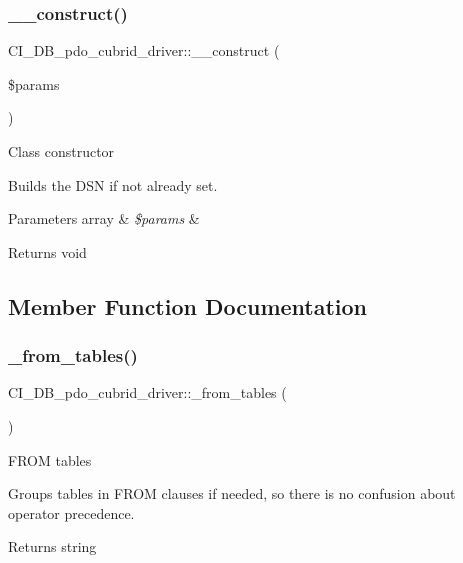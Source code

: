 \subsubsection{\texorpdfstring{\+\_\+\+\_\+construct()}{\_\_construct()}}
{\footnotesize\ttfamily C\+I\+\_\+\+D\+B\+\_\+pdo\+\_\+cubrid\+\_\+driver\+::\+\_\+\+\_\+construct (\begin{DoxyParamCaption}\item[{}]{\$params }\end{DoxyParamCaption})}

Class constructor

Builds the D\+SN if not already set.


\begin{DoxyParams}[1]{Parameters}
array & {\em \$params} & \\
\hline
\end{DoxyParams}
\begin{DoxyReturn}{Returns}
void 
\end{DoxyReturn}


\subsection{Member Function Documentation}
\mbox{\label{class_c_i___d_b__pdo__cubrid__driver_a87b21656939f1994c6f5010f947d7f2a}} 
\subsubsection{\texorpdfstring{\+\_\+from\+\_\+tables()}{\_from\_tables()}}
{\footnotesize\ttfamily C\+I\+\_\+\+D\+B\+\_\+pdo\+\_\+cubrid\+\_\+driver\+::\+\_\+from\+\_\+tables (\begin{DoxyParamCaption}{ }\end{DoxyParamCaption})\hspace{0.3cm}{\ttfamily [protected]}}

F\+R\+OM tables

Groups tables in F\+R\+OM clauses if needed, so there is no confusion about operator precedence.

\begin{DoxyReturn}{Returns}
string 
\end{DoxyReturn}
\mbox{\label{class_c_i___d_b__pdo__cubrid__driver_aee2ce1303247b157934c2ebd92e79d17}} 
